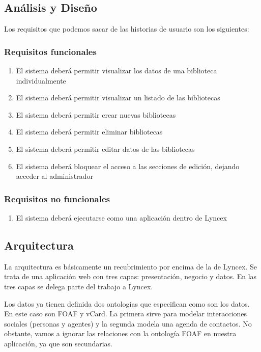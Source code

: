 \documentclass[12pt]{report} %
\begin{document}
\subsection{Análisis y Diseño}

Los requisitos que podemos sacar de las historias de usuario son los siguientes:

\subsubsection{Requisitos funcionales}
\begin{enumerate}
    \item El sistema deberá permitir visualizar los datos de una biblioteca individualmente
    \item El sistema deberá permitir visualizar un listado de las bibliotecas
    \item El sistema deberá permitir crear nuevas bibliotecas 
    \item El sistema deberá permitir eliminar bibliotecas
    \item El sistema deberá permitir editar datos de las bibliotecas
    \item El sistema deberá bloquear el acceso a las secciones de edición, dejando acceder al administrador
\end{enumerate}
\subsubsection{Requisitos no funcionales}
\begin{enumerate}
    \item El sistema deberá ejecutarse como una aplicación dentro de Lyncex
\end{enumerate}

\subsection{Arquitectura}

La arquitectura es básicamente un recubrimiento por encima de la de Lyncex. Se trata de una aplicación web con tres capas: presentación, negocio y datos. En las tres capas se delega parte del trabajo a Lyncex.

Los datos ya tienen definida dos ontologías que especifican como son los datos. En este caso son FOAF y vCard. La primera sirve para modelar interacciones sociales (personas y agentes) y la segunda modela una agenda de contactos. No obstante, vamos a ignorar las relaciones con la ontología FOAF en nuestra aplicación, ya que son secundarias.
\end{document}
